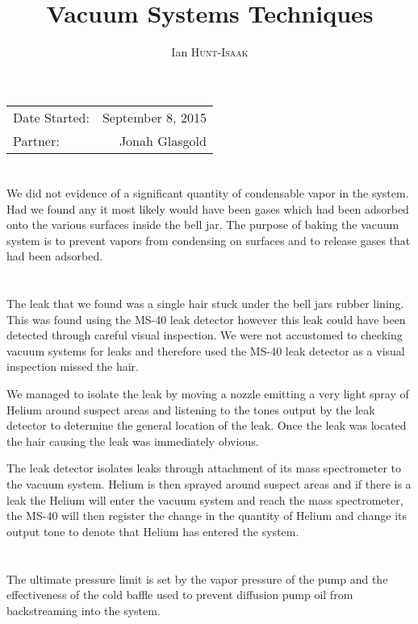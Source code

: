 \documentclass[12pt,a4paper]{article}
\title{Vacuum Systems Techniques} %
\author{Ian \textsc{Hunt-Isaak}} %
\begin{document}
\maketitle %

\begin{center}
\begin{tabular}{l r}
Date Started: & September 8, 2015 \\ %
Partner: & Jonah Glasgold \\%
\end{tabular}
\end{center}


\section{}
We did not evidence of a significant quantity of condensable vapor in the system. Had we found any it most likely would have been gases which had been adsorbed onto the various surfaces inside the bell jar. The purpose of baking the vacuum system is to prevent vapors from condensing on surfaces and to release gases that had been adsorbed. 
\section{}
The leak that we found was a single hair stuck under the bell jars rubber lining. This was found using the MS-40 leak detector however this leak could have been detected through careful visual inspection. We were not accustomed to checking vacuum systems for leaks and therefore used the MS-40 leak detector as a visual inspection missed the hair. 

We managed to isolate the leak by moving a nozzle emitting a very light spray of Helium around suspect areas and listening to the tones output by the leak detector to determine the general location of the leak. Once the leak was located the hair causing the leak was immediately obvious. 

The leak detector isolates leaks through attachment of its mass spectrometer to the vacuum system. Helium is then sprayed around suspect areas and if there is a leak the Helium will enter the vacuum system and reach the mass spectrometer, the MS-40 will then register the change in the quantity of Helium and change its output tone to denote that Helium has entered the system.
\section{}
The ultimate pressure limit is set by the vapor pressure of the pump and the effectiveness of the cold baffle used to prevent diffusion pump oil from backstreaming into the system.
\end{document}
